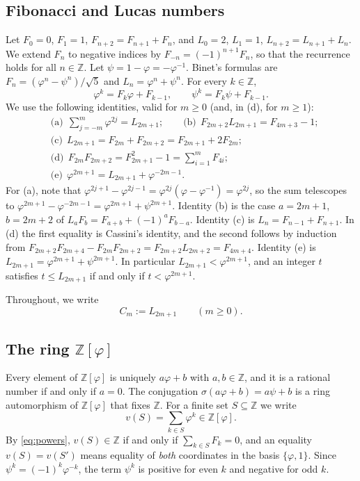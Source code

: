 \documentclass[11pt]{amsart}
\theoremstyle{definition}
\theoremstyle{remark}
\numberwithin{equation}{section}
\newcommand{\Z}{\mathbb{Z}}
\newcommand{\val}{v}
\begin{document}
\subsection{Fibonacci and Lucas numbers}
Let $F_0=0$, $F_1=1$, $F_{n+2}=F_{n+1}+F_n$, and $L_0=2$, $L_1=1$, $L_{n+2}=L_{n+1}+L_n$. We extend
$F_n$ to negative indices by $F_{-n}=(-1)^{n+1}F_n$, so that the recurrence holds for all $n\in\Z$.
Let $\psi=1-\varphi=-\varphi^{-1}$. Binet's formulas are $F_n=(\varphi^n-\psi^n)/\sqrt5$ and
$L_n=\varphi^n+\psi^n$. For every $k\in\Z$,
\begin{equation}\label{eq:powers}
  \varphi^k=F_k\varphi+F_{k-1},\qquad \psi^k=F_k\psi+F_{k-1}.
\end{equation}
We use the following identities, valid for $m\ge0$ (and, in (d), for $m\ge1$):
\begin{align}
 &\text{(a)}\ \ \sum_{j=-m}^{m}\varphi^{2j}=L_{2m+1}; \qquad
  \text{(b)}\ \ F_{2m+2}L_{2m+1}=F_{4m+3}-1; \label{eq:idA}\\
 &\text{(c)}\ \ L_{2m+1}=F_{2m}+F_{2m+2}=F_{2m+1}+2F_{2m}; \nonumber\\
 &\text{(d)}\ \ F_{2m}F_{2m+2}=F_{2m+1}^2-1=\sum_{i=1}^{m}F_{4i}; \nonumber\\
 &\text{(e)}\ \ \varphi^{2m+1}=L_{2m+1}+\varphi^{-2m-1}. \nonumber
\end{align}
For (a), note that $\varphi^{2j+1}-\varphi^{2j-1}=\varphi^{2j}(\varphi-\varphi^{-1})=\varphi^{2j}$, so
the sum telescopes to $\varphi^{2m+1}-\varphi^{-2m-1}=\varphi^{2m+1}+\psi^{2m+1}$. Identity (b) is
the case $a=2m+1$, $b=2m+2$ of $L_aF_b=F_{a+b}+(-1)^aF_{b-a}$. Identity (c) is
$L_n=F_{n-1}+F_{n+1}$. In (d) the first equality is Cassini's identity, and the second follows by
induction from $F_{2m+2}F_{2m+4}-F_{2m}F_{2m+2}=F_{2m+2}L_{2m+2}=F_{4m+4}$. Identity (e) is
$L_{2m+1}=\varphi^{2m+1}+\psi^{2m+1}$. In particular $L_{2m+1}<\varphi^{2m+1}$, and an integer $t$
satisfies $t\le L_{2m+1}$ if and only if $t<\varphi^{2m+1}$.

Throughout, we write
\[
  C_m:=L_{2m+1}\qquad(m\ge0).
\]

\subsection{\texorpdfstring{The ring $\Z[\varphi]$}{The ring Z[phi]}}
Every element of $\Z[\varphi]$ is uniquely $a\varphi+b$ with $a,b\in\Z$, and it is a rational
number if and only if $a=0$. The conjugation $\sigma(a\varphi+b)=a\psi+b$ is a ring automorphism of
$\Z[\varphi]$ that fixes $\Z$. For a finite set $S\subseteq\Z$ we write
\[
  \val(S)=\sum_{k\in S}\varphi^k\in\Z[\varphi].
\]
By \eqref{eq:powers}, $\val(S)\in\Z$ if and only if $\sum_{k\in S}F_k=0$, and an equality
$\val(S)=\val(S')$ means equality of \emph{both} coordinates in the basis $\{\varphi,1\}$. Since
$\psi^k=(-1)^k\varphi^{-k}$, the term $\psi^k$ is positive for even $k$ and negative for odd $k$.
\end{document}
